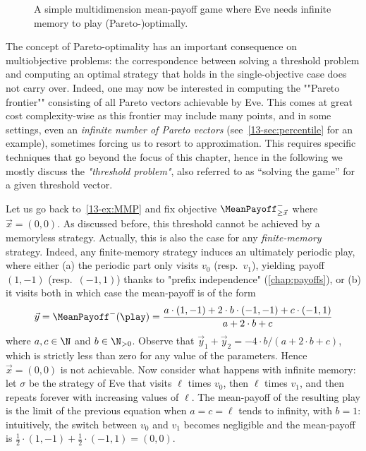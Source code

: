   
\begin{figure}[tbp]
  \centering
  \caption{A simple multidimension mean-payoff game where Eve needs infinite memory to play (Pareto-)optimally.}
  \label{13-fig:MultiMP}
\end{figure}

The concept of Pareto-optimality has an important consequence on multiobjective problems: the correspondence between solving a threshold problem and computing an optimal strategy that holds in the single-objective case does not carry over. Indeed, one may now be interested in computing the ""Pareto frontier"" consisting of all Pareto  vectors achievable by Eve. This comes at great cost complexity-wise as this frontier may include many points, and in some settings, even an \emph{infinite number of Pareto vectors} (see~\cref{13-sec:percentile} for an example),  sometimes forcing us to resort to approximation. This requires specific techniques that go beyond the focus of this chapter, hence in the following we mostly discuss the \emph{"threshold problem"}, also referred to as ``solving the game'' for a given threshold vector.

\begin{example}
\label{13-ex:MMP2}
Let us go back to~\cref{13-ex:MMP} and fix objective $\MeanPayoff^{-}_{\geq \vec{x}}$ where $\vec{x} = (0, 0)$. As discussed before, this threshold cannot be achieved by a memoryless strategy. Actually, this is also the case for any \emph{finite-memory} strategy. Indeed, any finite-memory strategy induces an ultimately periodic play, where either (a) the periodic part only visits $v_0$ (resp.~$v_1$), yielding payoff $(1,-1)$ (resp.~$(-1,1)$) thanks to "prefix independence" (\cref{chap:payoffs}), or (b) it visits both in which case the mean-payoff is of the form
\[
\vec{y} = \MeanPayoff^{-}(\play) = \dfrac{a \cdot (1, -1) + 2 \cdot b \cdot (-1, -1) + c \cdot (-1, 1)}{a + 2 \cdot b + c}
\]
where $a, c \in \N$ and $b \in \N_{>0}$. Observe that $\vec{y}_1 + \vec{y}_2 = -4\cdot b / (a + 2 \cdot b + c)$, which is strictly less than zero for any value of the parameters. Hence $\vec{x} = (0, 0)$ is not achievable. Now consider what happens with infinite memory: let $\sigma$ be the strategy of Eve that visits $\ell$ times $v_0$, then $\ell$ times  $v_1$, and then repeats forever with increasing values of $\ell$. The mean-payoff of the resulting play is the limit of the previous equation when $a = c = \ell$ tends to infinity, with $b = 1$: intuitively, the switch between $v_0$ and $v_1$ becomes negligible and the mean-payoff is $\frac{1}{2} \cdot (1,-1) + \frac{1}{2}\cdot(-1,1) = (0, 0)$.
\end{example}

